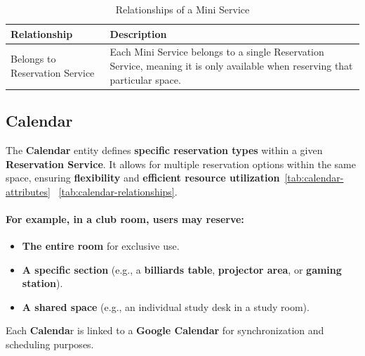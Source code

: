   \begin{table}[H]
  \centering
  \begin{tabularx}{\textwidth}{|l|X|}
  \hline
  \textbf{Relationship} & \textbf{Description} \\
  \hline
  Belongs to Reservation Service & Each Mini Service belongs to a single Reservation Service, meaning it is only available when reserving that particular space. \\
  \hline
  \end{tabularx}
  \caption{Relationships of a Mini Service}
  \label{tab:mini-service-relationships}
  \end{table}

\subsection{Calendar}

The \textbf{Calendar} entity defines \textbf{specific reservation types} within a given \textbf{Reservation Service}. It allows for multiple reservation options within the same space, ensuring \textbf{flexibility} and \textbf{efficient resource utilization}~\ref{tab:calendar-attributes} ~\ref{tab:calendar-relationships}.

\paragraph{For example, in a club room, users may reserve:}
\begin{itemize}
	\item \textbf{The entire room} for exclusive use.
	\item	\textbf{A specific section} (e.g., a \textbf{billiards table}, \textbf{projector area}, or \textbf{gaming station}).
	\item	\textbf{A shared space} (e.g., an individual study desk in a study room).
\end{itemize}

Each \textbf{Calenda}r is linked to a \textbf{Google Calendar} for synchronization and scheduling purposes.


